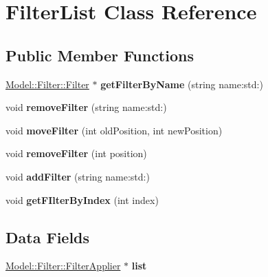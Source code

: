 \hypertarget{classModel_1_1Filter_1_1FilterList}{}\section{Filter\+List Class Reference}
\label{classModel_1_1Filter_1_1FilterList}
\subsection*{Public Member Functions}
\begin{DoxyCompactItemize}
\item 
\hypertarget{classModel_1_1Filter_1_1FilterList_ae012a5d454b3f7ac87ad704cf5cbaedc}{}\hyperlink{classModel_1_1Filter_1_1Filter}{Model\+::\+Filter\+::\+Filter} $\ast$ {\bfseries get\+Filter\+By\+Name} (string name\+:std\+:)\label{classModel_1_1Filter_1_1FilterList_ae012a5d454b3f7ac87ad704cf5cbaedc}

\item 
\hypertarget{classModel_1_1Filter_1_1FilterList_aa4b065915c41845aa7c58528dfcb1665}{}void {\bfseries remove\+Filter} (string name\+:std\+:)\label{classModel_1_1Filter_1_1FilterList_aa4b065915c41845aa7c58528dfcb1665}

\item 
\hypertarget{classModel_1_1Filter_1_1FilterList_a13c4ca4bd21b65ab2e2f01556338d095}{}void {\bfseries move\+Filter} (int old\+Position, int new\+Position)\label{classModel_1_1Filter_1_1FilterList_a13c4ca4bd21b65ab2e2f01556338d095}

\item 
\hypertarget{classModel_1_1Filter_1_1FilterList_a3cd55a8f60d5021235199170937644c5}{}void {\bfseries remove\+Filter} (int position)\label{classModel_1_1Filter_1_1FilterList_a3cd55a8f60d5021235199170937644c5}

\item 
\hypertarget{classModel_1_1Filter_1_1FilterList_a0fd61eb6483e3c34ed6deeef3f5951e1}{}void {\bfseries add\+Filter} (string name\+:std\+:)\label{classModel_1_1Filter_1_1FilterList_a0fd61eb6483e3c34ed6deeef3f5951e1}

\item 
\hypertarget{classModel_1_1Filter_1_1FilterList_aa7105d83432b04a253e24d31f07f9961}{}void {\bfseries get\+F\+Ilter\+By\+Index} (int index)\label{classModel_1_1Filter_1_1FilterList_aa7105d83432b04a253e24d31f07f9961}

\end{DoxyCompactItemize}
\subsection*{Data Fields}
\begin{DoxyCompactItemize}
\item 
\hypertarget{classModel_1_1Filter_1_1FilterList_ab39a18341dbb48fa403ad2b0e719bcf4}{}\hyperlink{classModel_1_1Filter_1_1FilterApplier}{Model\+::\+Filter\+::\+Filter\+Applier} $\ast$ {\bfseries list}\label{classModel_1_1Filter_1_1FilterList_ab39a18341dbb48fa403ad2b0e719bcf4}

\end{DoxyCompactItemize}
